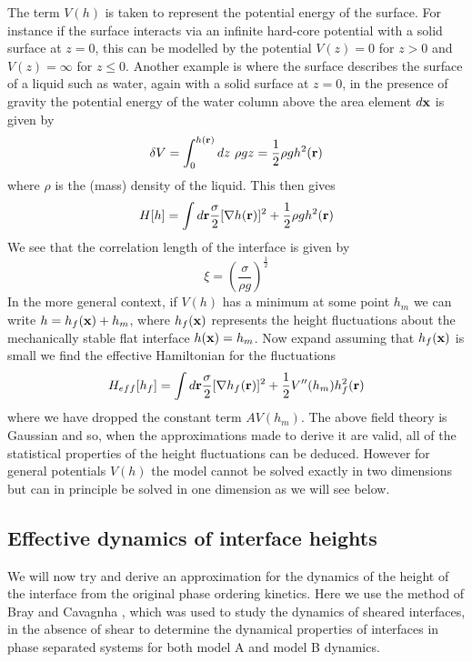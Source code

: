 The term $V(h)$ is taken to represent the potential energy of the surface. For instance if the surface interacts via an infinite hard-core potential with a solid surface at $z=0$, this can be modelled by the potential $V(z) =0$ for $z \greater 0$ and $V(z)=\infty$ for $z\leq 0$. Another example is where the surface describes the surface of a liquid such as water, again with a solid surface at $z=0$, in the presence of gravity the potential energy of the water column above the area 
element $d{\bf x}$ is given by
\begin{equation}
\delta V = \int_0^{h({\bf r})} dz\ \rho g z = \frac{1}{2}\rho g h^2({\bf r})
\end{equation}
where $\rho$ is the (mass) density of the liquid. This then gives
\begin{equation}
H[h] = \int d{\bf r} \frac{\sigma}{2}[\nabla h({\bf r})]^2 + \frac{1}{2}\rho g h^2({\bf r})
\end{equation}
We see that the correlation length of the interface is given by
\begin{equation}
\xi = \left(\frac{\sigma}{\rho g}\right)^{\frac{1}{2}}
\end{equation}
In the more general context, if $V(h)$ has a minimum at some point $h_m$ we can write $h= h_f({\bf x})+ h_m$, where $h_f({\bf x})$ represents the height fluctuations about the mechanically stable flat interface $h({\bf x})=h_m$. Now expand assuming that $h_f({\bf x})$ is
small we find the effective Hamiltonian for the fluctuations
\begin{equation}
H_{eff}[h_f] = \int d{\bf r} \frac{\sigma}{2}[\nabla h_f({\bf r})]^2 + \frac{1}{2}V''(h_m) h_f^2({\bf r})
\end{equation}
where we have dropped the constant term $AV(h_m)$. The above field theory is Gaussian and 
so, when the approximations made to derive it are valid, all of the statistical properties of the height fluctuations can be deduced. However for general potentials $V(h)$ the model cannot be solved exactly in two dimensions but can in principle be solved in one dimension as we will see below.

\subsection{Effective dynamics of interface heights}
\label{sec-heightd}
We will now try and derive an approximation for the dynamics of the height of the interface from the original phase ordering kinetics. Here we use the method of Bray and Cavagnha \cite{bray_interface_2001,bray_interface_2001-1}, which was used to study the dynamics of sheared interfaces, in the absence of shear to determine the dynamical properties of interfaces in phase separated systems for both model A and model B dynamics.

